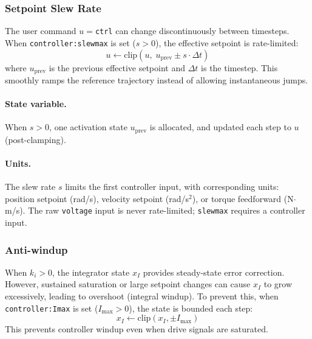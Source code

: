 \documentclass[10pt, a4paper, twocolumn]{article}
\let\oldtexttt\texttt
\renewcommand{\texttt}[1]{{\smaller\oldtexttt{#1}}}
\newcommand{\atSLEW}{\texttt{controller:slewmax}}
\newcommand{\atIMAXINT}{\texttt{controller:Imax}}
\begin{document}
\subsubsection{Setpoint Slew Rate}
\label{sec:setpoint_slew}

The user command $u = {}$\texttt{ctrl} can change discontinuously between timesteps. When \atSLEW{} is set ($s > 0$), the effective setpoint is rate-limited:
\begin{equation*}
  u \leftarrow \text{clip}(u, \; u_{\text{prev}} \pm s \cdot \Delta t)
\end{equation*}
where $u_{\text{prev}}$ is the previous effective setpoint and $\Delta t$ is the timestep. This smoothly ramps the reference trajectory instead of allowing instantaneous jumps.

\paragraph{State variable.} When $s > 0$, one activation state $u_{\text{prev}}$ is allocated, and updated each step to $u$ (post-clamping).

\paragraph{Units.} The slew rate $s$ limits the first controller input, with corresponding units: position setpoint (rad/s), velocity setpoint (rad/s$^2$), or torque feedforward (N$\cdot$m/s). The raw \texttt{voltage} input is never rate-limited; \texttt{slewmax} requires a controller input.

\subsubsection{Anti-windup}
\label{sec:anti_windup}

When $k_i > 0$, the integrator state $x_I$ provides steady-state error correction. However, sustained saturation or large setpoint changes can cause $x_I$ to grow excessively, leading to overshoot (integral windup). To prevent this, when \atIMAXINT{} is set ($I_{\max} > 0$), the state is bounded each step:
\begin{equation*}
  x_I \leftarrow \text{clip}(x_I, \pm I_{\max})
\end{equation*}
This prevents controller windup even when drive signals are saturated.
\end{document}
